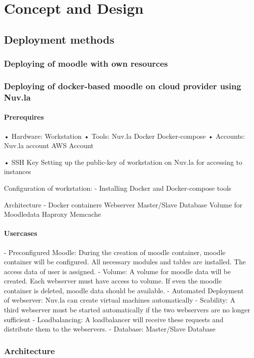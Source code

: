 \chapter{Concept and Design}
\label{cha:conceptanddesign}
\section{Deployment methods}
\subsection{Deploying of moodle with own resources}
\subsection{Deploying of docker-based moodle on cloud provider using Nuv.la  }
\subsubsection{Prerequires}

•	Hardware:
Workstation
•	Tools:
Nuv.la
Docker
Docker-compose
•	Accounts:
Nuv.la account
AWS Account

•	SSH Key
Setting up the public-key of workstation on Nuv.la for accessing to instances

Configuration of workstation:
-	Installing Docker and Docker-compose tools

Architecture
-	Docker containers
Webserver
Master/Slave Database
Volume for Moodledata
Haproxy
Memcache


\subsubsection{Usercases}
-	Preconfigured Moodle: During the creation of moodle container, moodle container will be configured. All necessary modules and tables are installed. The access data of user is assigned. 
-	Volume: A volume for moodle data will be created. Each webserver must have access to volume. If even the moodle container is deleted, moodle data should be available.
-	Automated Deployment of webserver: Nuv.la can create virtual machines automatically
-	Scability:  A third webserver must be started automatically if the two webservers are no longer sufficient
-	Loadbalancing:  A loadbalancer will receive these requests and distribute them to the webservers. 
-	Database:  Master/Slave Database

\subsection{Architecture}
